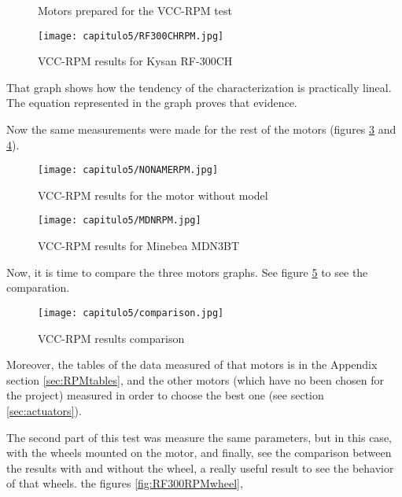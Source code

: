 \begin{figure}[H]
\centering
{}
\caption{Motors prepared for the VCC-RPM test} \label{fig:motorprepared}
\end{figure}

\begin{figure}[H]
	\centering
		\texttt{[image: capitulo5/RF300CHRPM.jpg]}
	\caption{VCC-RPM results for Kysan RF-300CH}
	\label{fig:RF300RPM}
\end{figure}

That graph shows how the tendency of the characterization is practically lineal. The equation represented in the graph proves that evidence.

Now the same measurements were made for the rest of the motors (figures \ref{fig:NONAMERPM} and \ref{fig:MDNRPM}). 

\begin{figure}[H]
	\centering
		\texttt{[image: capitulo5/NONAMERPM.jpg]}
	\caption{VCC-RPM results for the motor without model}
	\label{fig:NONAMERPM}
\end{figure}

\begin{figure}[H]
	\centering
		\texttt{[image: capitulo5/MDNRPM.jpg]}
	\caption{VCC-RPM results for Minebea MDN3BT}
	\label{fig:MDNRPM}
\end{figure}

Now, it is time to compare the three motors graphs. See figure \ref{fig:comparison} to see the comparation.

\begin{figure}[H]
	\centering
		\texttt{[image: capitulo5/comparison.jpg]}
	\caption{VCC-RPM results comparison}
	\label{fig:comparison}
\end{figure}

Moreover, the tables of the data measured of that motors is in the Appendix section \ref{sec:RPMtables}, and the other motors (which have no been chosen for the project) measured in order to choose the best one (see section \ref{sec:actuators}).

The second part of this test was measure the same parameters, but in this case, with the wheels mounted on the motor, and finally, see the comparison between the results with and without the wheel, a really useful result to see the behavior of that wheels. the figures \ref{fig:RF300RPMwheel}, 


